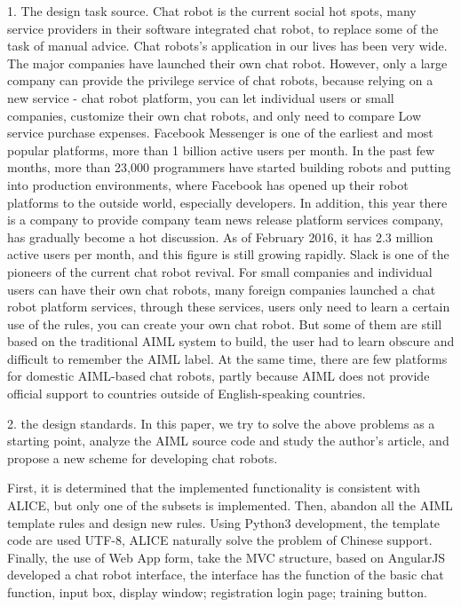 \documentclass[bachelor,winfonts]{jnuthesis}
\begin{document}
\begin{englishabstract}
1. The design task source. Chat robot is the current social hot spots, many service providers in their software integrated chat robot, to replace some of the task of manual advice. Chat robots's application in our lives has been very wide. The major companies have launched their own chat robot. However, only a large company can provide the privilege service of chat robots, because relying on a new service - chat robot platform, you can let individual users or small companies, customize their own chat robots, and only need to compare Low service purchase expenses. Facebook Messenger is one of the earliest and most popular platforms, more than 1 billion active users per month. In the past few months, more than 23,000 programmers have started building robots and putting into production environments, where Facebook has opened up their robot platforms to the outside world, especially developers. In addition, this year there is a company to provide company team news release platform services company, has gradually become a hot discussion. As of February 2016, it has 2.3 million active users per month, and this figure is still growing rapidly. Slack is one of the pioneers of the current chat robot revival. For small companies and individual users can have their own chat robots, many foreign companies launched a chat robot platform services, through these services, users only need to learn a certain use of the rules, you can create your own chat robot. But some of them are still based on the traditional AIML system to build, the user had to learn obscure and difficult to remember the AIML label. At the same time, there are few platforms for domestic AIML-based chat robots, partly because AIML does not provide official support to countries outside of English-speaking countries.

2. the design standards. In this paper, we try to solve the above problems as a starting point, analyze the AIML source code and study the author's article, and propose a new scheme for developing chat robots.

First, it is determined that the implemented functionality is consistent with ALICE, but only one of the subsets is implemented. Then, abandon all the AIML template rules and design new rules. Using Python3 development, the template code are used UTF-8, ALICE naturally solve the problem of Chinese support. Finally, the use of Web App form, take the MVC structure, based on AngularJS developed a chat robot interface, the interface has the function of the basic chat function, input box, display window; registration login page; training button.


\end{englishabstract}
\end{document}
